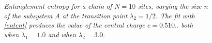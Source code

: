 \documentclass[aps,pra,superscriptaddress]{revtex4}
\renewcommand{\(}{\left(}
\renewcommand{\)}{\right)}
\renewcommand{\[}{\left[}
\renewcommand{\]}{\right]}
\begin{document}
\begin{figure}[H]
\center
{}
\caption{{\em Entanglement entropy for a chain of $N=10$ sites, varying the size $n$ of the subsystem $A$ at the transition point $\lambda_2 = 1/2$. The fit with \eqref{entent} produces the value of the central charge $c=0.510..$ both when $\lambda_1=1.0$ and when $\lambda_2=3.0$. }}
\label{ee22}
\end{figure}
\end{document}
